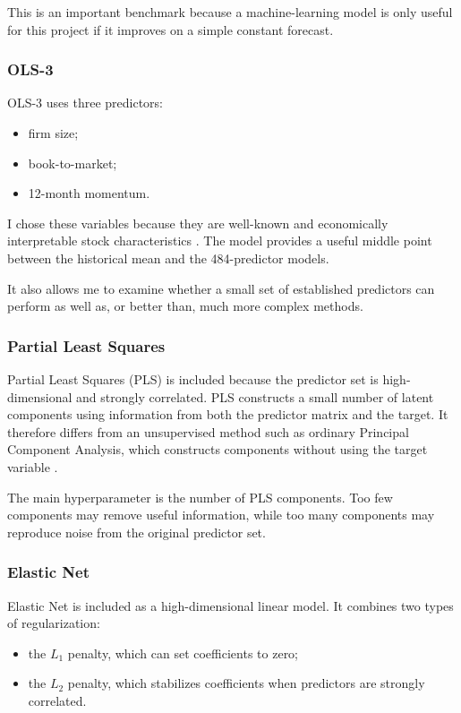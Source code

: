 \documentclass[11pt,a4paper]{article}
\begin{document}
This is an important benchmark because a machine-learning model is only useful
for this project if it improves on a simple constant forecast.

\subsubsection*{OLS-3}

OLS-3 uses three predictors:

\begin{itemize}
  \item firm size;
  \item book-to-market;
  \item 12-month momentum.
\end{itemize}

I chose these variables because they are well-known and economically
interpretable stock characteristics
\parencite{fama1992cross,jegadeesh1993returns}. The model provides a useful
middle point between the historical mean and the 484-predictor models.

It also allows me to examine whether a small set of established predictors can
perform as well as, or better than, much more complex methods.

\subsubsection*{Partial Least Squares}

Partial Least Squares (PLS) is included because the predictor set is
high-dimensional and strongly correlated. PLS constructs a small number of
latent components using information from both the predictor matrix and the
target. It therefore differs from an unsupervised method such as ordinary
Principal Component Analysis, which constructs components without using the
target variable \parencite{wold1984collinearity}.

The main hyperparameter is the number of PLS components. Too few components may
remove useful information, while too many components may reproduce noise from
the original predictor set.

\subsubsection*{Elastic Net}

Elastic Net is included as a high-dimensional linear model. It combines two
types of regularization:

\begin{itemize}
  \item the \(L_1\) penalty, which can set coefficients to zero;
  \item the \(L_2\) penalty, which stabilizes coefficients when predictors are
        strongly correlated.
\end{itemize}
\end{document}

